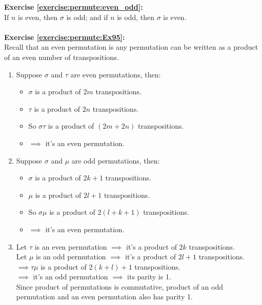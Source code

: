 \noindent\textbf{Exercise  \ref{exercise:permute:even_odd}:}\\
If $n$ is even, then $\sigma$ is odd; and if $n$ is odd, then $\sigma$ is even.\\
\\

\noindent\textbf{Exercise  \ref{exercise:permute:Ex95}:}\\
Recall that an even permutation is any permutation can be written as a product of an even number of transpositions.
\begin{enumerate}[{a.}]
\item
Suppose $\sigma$ and $\tau$ are even permutations, then:
	\begin{itemize}
	\item
	$\sigma$ is a product of $2m$ transpositions.

	\item
	$\tau$ is a product of $2n$ transpositions.

	\item
	So $\sigma\tau$ is a product of $(2m+2n)$ transpositions.

	\item
	$\implies$  it's an even permutation.
	\end{itemize}

\item
Suppose $\sigma$ and $\mu$ are odd permutations, then:
	\begin{itemize}
	\item
	$\sigma$ is a product of $2k+1$ transpositions.

	\item
	$\mu$ is a product of $2l+1$ transpositions.

	\item
	So $\sigma\mu$ is a product of $2(l+k+1)$ transpositions.
	
	\item
	$\implies$  it's an even permutation.
	\end{itemize}

\item
Let $\tau$ is an even permutation $\implies$  it's a product of $2k$ transpositions.\\
Let $\mu$ is an odd permutation $\implies$  it's a product of $2l+1$ transpositions.\\
$\implies \tau\mu$ is a product of $2(k+l)+1$ transpositions.\\
$\implies$  it's an odd permutation $\implies$  its parity is 1.\\
Since product of permutations is commutative, product of an odd permutation and an even permutation also has parity 1.
\end{enumerate}